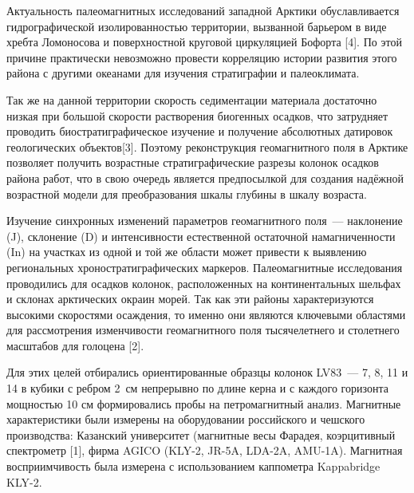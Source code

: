  

\makeProcTitle
{}

Актуальность палеомагнитных исследований западной Арктики обуславливается гидрографической изолированностью территории, вызванной барьером в виде хребта Ломоносова и поверхностной круговой циркуляцией Бофорта [4]. По этой причине практически невозможно провести корреляцию истории развития этого района с другими океанами для изучения стратиграфии и палеоклимата.

Так же на данной территории скорость седиментации материала достаточно низкая при большой скорости растворения биогенных осадков, что затрудняет проводить биостратиграфическое изучение и получение абсолютных датировок геологических объектов[3]. Поэтому реконструкция геомагнитного поля в Арктике позволяет получить возрастные стратиграфические разрезы колонок осадков района работ, что в свою очередь является предпосылкой для создания надёжной возрастной модели для преобразования шкалы глубины в шкалу возраста.

Изучение синхронных изменений параметров геомагнитного поля~--- наклонение (J), склонение (D) и интенсивности естественной остаточной намагниченности (In) на участках из одной и той же области может привести к выявлению региональных хроностратиграфических маркеров. Палеомагнитные исследования проводились для осадков колонок, расположенных на континентальных шельфах и склонах арктических окраин морей. Так как эти районы характеризуются высокими скоростями осаждения, то именно они являются ключевыми областями для рассмотрения изменчивости геомагнитного поля тысячелетнего и столетнего масштабов для голоцена [2].

 Для этих целей отбирались ориентированные образцы колонок LV83~--- 7, 8, 11 и 14 в кубики с ребром 2~см непрерывно по длине керна и с каждого горизонта мощностью 10 см формировались пробы на петромагнитный анализ. Магнитные характеристики были измерены на оборудовании российского и чешского производства: Казанский университет (магнитные весы Фарадея, коэрцитивный спектрометр [1], фирма AGICO (KLY-2, JR-5A, LDA-2A, AMU-1A). Магнитная восприимчивость была измерена с использованием каппометра Kappabridge KLY-2.

